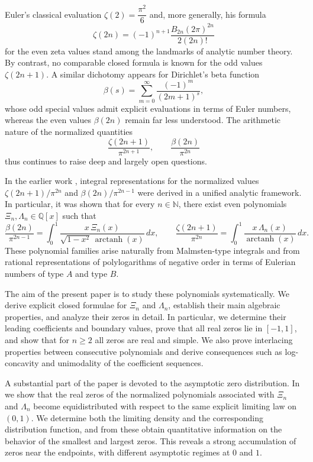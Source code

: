 \documentclass[11pt,twoside]{article}
\numberwithin{equation}{section}
\begin{document}
Euler’s classical evaluation
\(
\zeta(2)=\dfrac{\pi^{2}}{6}
\)
and, more generally, his formula
\[
\zeta(2n)=(-1)^{n+1}\frac{B_{2n}(2\pi)^{2n}}{2(2n)!}
\]
for the even zeta values stand among the landmarks of analytic number theory. By contrast, no comparable closed formula is known for the odd values \(\zeta(2n+1)\). A similar dichotomy appears for Dirichlet’s beta function
\[
\beta(s)=\sum_{m=0}^{\infty}\frac{(-1)^m}{(2m+1)^s},
\]
whose odd special values admit explicit evaluations in terms of Euler numbers, whereas the even values \(\beta(2n)\) remain far less understood. The arithmetic nature of the normalized quantities
\[
\frac{\zeta(2n+1)}{\pi^{2n+1}},
\qquad
\frac{\beta(2n)}{\pi^{2n}}
\]
thus continues to raise deep and largely open questions.

\vspace{0.2cm}

In the earlier work \cite{TallaWaffo2025arxiv2511.02843}, integral representations for the normalized values \(\zeta(2n+1)/\pi^{2n}\) and \(\beta(2n)/\pi^{2n-1}\) were derived in a unified analytic framework. In particular, it was shown that for every \(n\in\mathbb{N}\), there exist even polynomials \(\Xi_n,\Lambda_n\in\mathbb{Q}[x]\) such that
\[
\frac{\beta(2n)}{\pi^{2n-1}}
=
\int_0^1 \frac{x\,\Xi_n(x)}{\sqrt{1-x^2}\,\operatorname{arctanh}(x)}\,dx,
\qquad
\frac{\zeta(2n+1)}{\pi^{2n}}
=
\int_0^1 \frac{x\,\Lambda_n(x)}{\operatorname{arctanh}(x)}\,dx.
\]
These polynomial families arise naturally from Malmsten-type integrals and from rational representations of polylogarithms of negative order in terms of Eulerian numbers of type \(A\) and type \(B\).

\vspace{0.2cm}

The aim of the present paper is to study these polynomials systematically. We derive explicit closed formulae for \(\Xi_n\) and \(\Lambda_n\), establish their main algebraic properties, and analyze their zeros in detail. In particular, we determine their leading coefficients and boundary values, prove that all real zeros lie in \([-1,1]\), and show that for \(n\ge2\) all zeros are real and simple. We also prove interlacing properties between consecutive polynomials and derive consequences such as log-concavity and unimodality of the coefficient sequences.

\vspace{0.2cm}

A substantial part of the paper is devoted to the asymptotic zero distribution. In  we show that the real zeros of the normalized polynomials associated with \(\Xi_n\) and \(\Lambda_n\) become equidistributed with respect to the same explicit limiting law on \((0,1)\). We determine both the limiting density and the corresponding distribution function, and from these obtain quantitative information on the behavior of the smallest and largest zeros. This reveals a strong accumulation of zeros near the endpoints, with different asymptotic regimes at \(0\) and \(1\).
\end{document}
